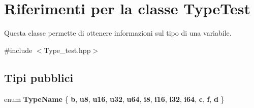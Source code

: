 \hypertarget{struct_type_test}{}\section{Riferimenti per la classe Type\+Test}
\label{struct_type_test}


Questa classe permette di ottenere informazioni sul tipo di una variabile.  




{\ttfamily \#include $<$Type\+\_\+test.\+hpp$>$}

\subsection*{Tipi pubblici}
\begin{DoxyCompactItemize}
\item 
\mbox{\label{struct_type_test_a778746484056922a147aea7f653cee0c}} 
enum {\bfseries Type\+Name} \{ \newline
{\bfseries b}, 
{\bfseries u8}, 
{\bfseries u16}, 
{\bfseries u32}, 
\newline
{\bfseries u64}, 
{\bfseries i8}, 
{\bfseries i16}, 
{\bfseries i32}, 
\newline
{\bfseries i64}, 
{\bfseries c}, 
{\bfseries f}, 
{\bfseries d}
 \}
\end{DoxyCompactItemize}
